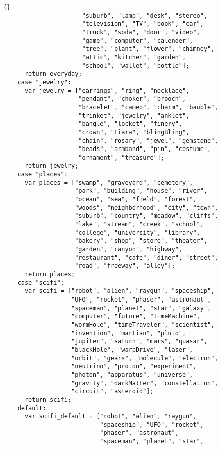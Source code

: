 \documentclass[twoside]{article}
\begin{document}
\begin{lstlisting}{}
                      "suburb", "lamp", "desk", "stereo",
                      "television", "TV", "book", "car",
                      "truck", "soda", "door", "video",
                      "game", "computer", "calender",
                      "tree", "plant", "flower", "chimney",
                      "attic", "kitchen", "garden",
                      "school", "wallet", "bottle"];
      return everyday;
    case "jewelry":
      var jewelry = ["earrings", "ring", "necklace",
                     "pendant", "choker", "brooch",
                     "bracelet", "cameo", "charm", "bauble",
                     "trinket", "jewelry", "anklet",
                     "bangle", "locket", "finery",
                     "crown", "tiara", "blingBling",
                     "chain", "rosary", "jewel", "gemstone",
                     "beads", "armband", "pin", "costume",
                     "ornament", "treasure"];
      return jewelry;
    case "places":
      var places = ["swamp", "graveyard", "cemetery",
                    "park", "building", "house", "river",
                    "ocean", "sea", "field", "forest",
                    "woods", "neighborhood", "city", "town",
                    "suburb", "country", "meadow", "cliffs",
                    "lake", "stream", "creek", "school",
                    "college", "university", "library",
                    "bakery", "shop", "store", "theater",
                    "garden", "canyon", "highway",
                    "restaurant", "cafe", "diner", "street",
                    "road", "freeway", "alley"];
      return places;
    case "scifi":
      var scifi = ["robot", "alien", "raygun", "spaceship",
                   "UFO", "rocket", "phaser", "astronaut",
                   "spaceman", "planet", "star", "galaxy", 
                   "computer", "future", "timeMachine",
                   "wormHole", "timeTraveler", "scientist",
                   "invention", "martian", "pluto",
                   "jupiter", "saturn", "mars", "quasar",
                   "blackHole", "warpDrive", "laser",
                   "orbit", "gears", "molecule", "electron",
                   "neutrino", "proton", "experiment",
                   "photon", "apparatus", "universe",
                   "gravity", "darkMatter", "constellation",
                   "circuit", "asteroid"];
      return scifi;
    default:
      var scifi_default = ["robot", "alien", "raygun",
                           "spaceship", "UFO", "rocket",
                           "phaser", "astronaut",
                           "spaceman", "planet", "star",

\end{lstlisting}
\end{document}
